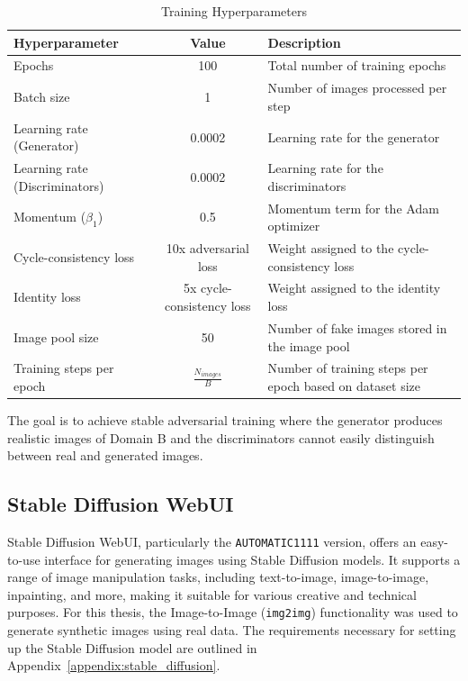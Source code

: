 \documentclass[12pt,DIV14,BCOR12mm,a4paper,footinclude=false,headinclude,parskip=half-,twoside,openright,cleardoublepage=empty,toc=index,bibliography=totoc,listof=totoc]{scrreprt}
\numberwithin{equation}{chapter}
\begin{document}
\begin{table}[H]
    \centering
    \caption{Training Hyperparameters}
    \label{tab:hyperparameters}
    \begin{tabularx}{\textwidth}{XcX} %
        \toprule
        \textbf{Hyperparameter} & \textbf{Value} & \textbf{Description} \\ 
        \midrule
        Epochs & 100 & Total number of training epochs \\ 
        \midrule
        Batch size & 1 & Number of images processed per step \\ 
        \midrule
        Learning rate (Generator) & 0.0002 & Learning rate for the generator \\ 
        \midrule
        Learning rate (Discriminators) & 0.0002 & Learning rate for the discriminators \\ 
        \midrule
        Momentum (\( \beta_1 \)) & 0.5 & Momentum term for the Adam optimizer \\ 
        \midrule
        Cycle-consistency loss & 10x adversarial loss & Weight assigned to the cycle-consistency loss \\ 
        \midrule
        Identity loss & 5x cycle-consistency loss & Weight assigned to the identity loss \\ 
        \midrule
        Image pool size & 50 & Number of fake images stored in the image pool \\ 
        \midrule
        Training steps per epoch & \( \frac{N_{images}}{B} \) & Number of training steps per epoch based on dataset size \\ 
        \bottomrule
    \end{tabularx}
\end{table}

The goal is to achieve stable adversarial training where the generator produces realistic images of Domain B and the discriminators cannot easily distinguish between real and generated images.

\subsection{Stable Diffusion WebUI}
\label{sec:stable_diffusion}

Stable Diffusion WebUI, particularly the \texttt{AUTOMATIC1111} version, offers an easy-to-use interface for generating images using Stable Diffusion models. It supports a range of image manipulation tasks, including text-to-image, image-to-image, inpainting, and more, making it suitable for various creative and technical purposes. For this thesis, the Image-to-Image (\texttt{img2img}) functionality was used to generate synthetic images using real data. The requirements necessary for setting up the Stable Diffusion model are outlined in Appendix~\ref{appendix:stable_diffusion}.
\end{document}
